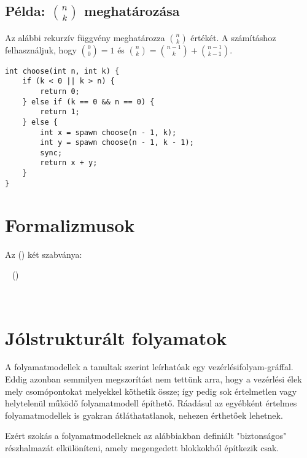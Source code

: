\subsection{Példa: $n \choose k$ meghatározása}

Az alábbi rekurzív függvény meghatározza $n \choose k$ értékét. A számításhoz felhasználjuk, hogy ${0 \choose 0} = 1$ és ${n \choose k} = {n-1 \choose k} + {n-1 \choose k-1}$.


\begin{minipage}{\balhasab}
\begin{lstlisting}
int choose(int n, int k) {
	if (k < 0 || k > n) {
		return 0;
	} else if (k == 0 && n == 0) {
		return 1;
	} else {
		int x = spawn choose(n - 1, k);
		int y = spawn choose(n - 1, k - 1);
		sync;
		return x + y;
	}
}
\end{lstlisting}
\end{minipage}
\begin{minipage}{\jobbhasab}
\end{minipage}



\section{Formalizmusok}

Az  () két szabványa:

~\cite{UML}  ()

~\cite{omg2011bpmn}





\section{Jólstrukturált folyamatok}\label{sec:jolstrukturalt-folyamatok}

A folyamatmodellek a tanultak szerint leírhatóak egy vezérlésifolyam-gráffal. Eddig azonban semmilyen megszorítást nem tettünk arra, hogy a vezérlési élek mely csomópontokat melyekkel köthetik össze; így pedig sok értelmetlen vagy helytelenül működő folyamatmodell építhető. Ráadásul az egyébként értelmes folyamatmodellek is gyakran átláthatatlanok, nehezen érthetőek lehetnek.

Ezért szokás a folyamatmodelleknek az alábbiakban definiált "biztonságos" részhalmazát elkülöníteni, amely megengedett blokkokból építkezik csak.

